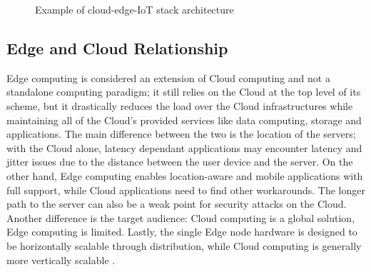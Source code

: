 \begin{figure}[h]
    \centering
    \caption{Example of cloud-edge-IoT stack architecture}
    \label{fig:ceiot_stack}
\end{figure}

\subsection{Edge and Cloud Relationship}
Edge computing is considered an extension of Cloud computing and not a standalone computing paradigm; it still relies on the Cloud at the top level of its scheme, but it drastically reduces the load over the Cloud infrastructures while maintaining all of the Cloud's provided services like data computing, storage and applications. The main difference between the two is the location of the servers; with the Cloud alone, latency dependant applications may encounter latency and jitter issues due to the distance between the user device and the server. On the other hand, Edge computing enables location-aware and mobile applications with full support, while Cloud applications need to find other workarounds. The longer path to the server can also be a weak point for security attacks on the Cloud. Another difference is the target audience: Cloud computing is a global solution, Edge computing is limited. Lastly, the single Edge node hardware is designed to be horizontally scalable through distribution, while Cloud computing is generally more vertically scalable \cite{khan2019edge}.



